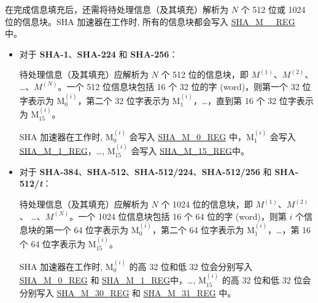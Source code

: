 \documentclass[main\_\_CN.tex]{subfiles}
\begin{document}
在完成信息填充后，还需将待处理信息（及其填充）解析为 \begin{math}N\end{math} 个 512 位或 1024 位的信息块。SHA 加速器在工作时, 所有的信息块都会写入 \hyperref[regdesc:SHAMNREG]{SHA\_M\_\_REG} 中。

\begin{itemize}
    \item 对于 \textbf{SHA-1}、\textbf{SHA-224} 和 \textbf{SHA-256}：
    
    待处理信息（及其填充）应解析为 \begin{math}N\end{math} 个 512 位的信息块，即 \begin{math}M^{(1)}\end{math}、\begin{math}M^{(2)}\end{math}、 \dots、\begin{math}M^{(N)}\end{math}。一个 512 位信息块包括 16 个 32 位的字 (word)，则第一个 32 位字表示为 M$^{(i)}_{0}$，第二个 32 位字表示为 M$^{(i)}_{1}$，\dots，直到第 16 个 32 位字表示为 M$^{(i)}_{15}$。

    SHA 加速器在工作时, M$^{(i)}_{0}$ 会写入 \hyperref[regdesc:SHAMNREG]{SHA\_M\_0\_REG} 中，M$^{(i)}_1$ 会写入 \hyperref[regdesc:SHAMNREG]{SHA\_M\_1\_REG}，\dots, M$^{(i)}_{15}$ 会写入 \hyperref[regdesc:SHAMNREG]{SHA\_M\_15\_REG}中。
    
    \item 对于 \textbf{SHA-384}、\textbf{SHA-512}、\textbf{SHA-512/224}、\textbf{SHA-512/256} 和 \textbf{SHA-512/\it{t}}：
    
    待处理信息（及其填充）应解析为 \begin{math}N\end{math} 个 1024 位的信息块，即 \begin{math}M^{(1)}\end{math}、\begin{math}M^{(2)}\end{math}、 \dots、\begin{math}M^{(N)}\end{math}。一个 1024 位信息块包括 16 个 64 位的字 (word)，则第 \begin{math}i\end{math} 个信息块的第一个 64 位字表示为 M$^{(i)}_{0}$，第二个 64 位字表示为 M$^{(i)}_{1}$，\dots，第 16 个 64 位字表示为 M$^{(i)}_{15}$。

    SHA 加速器在工作时, M$^{(i)}_{0}$ 的高 32 位和低 32 位会分别写入 \hyperref[regdesc:SHAMNREG]{SHA\_M\_0\_REG} 和 \hyperref[regdesc:SHAMNREG]{SHA\_M\_1\_REG}中，\dots, M$^{(i)}_{15}$ 的高 32 位和低 32 位会分别写入 \hyperref[regdesc:SHAMNREG]{SHA\_M\_30\_REG} 和 \hyperref[regdesc:SHAMNREG]{SHA\_M\_31\_REG} 中。
        
\end{itemize}
\end{document}

